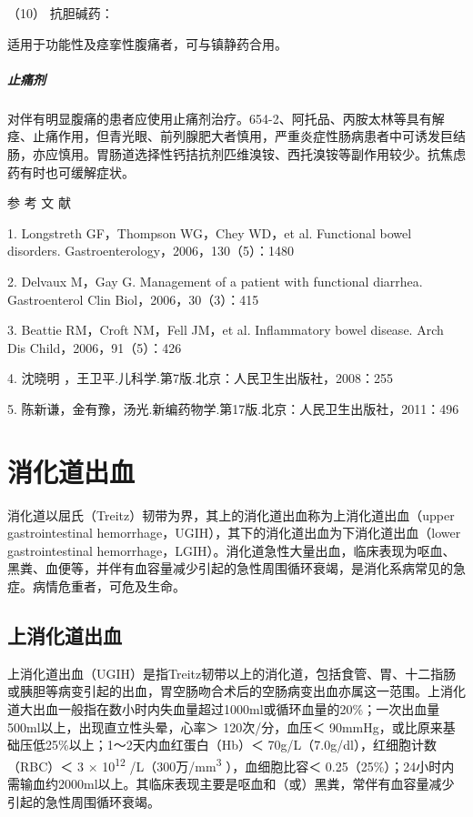 \hypertarget{text00030.htmlux5cux23CHP1-12-3-2-6-10}{}
（10） 抗胆碱药：

适用于功能性及痉挛性腹痛者，可与镇静药合用。

\paragraph{止痛剂}

对伴有明显腹痛的患者应使用止痛剂治疗。654-2、阿托品、丙胺太林等具有解痉、止痛作用，但青光眼、前列腺肥大者慎用，严重炎症性肠病患者中可诱发巨结肠，亦应慎用。胃肠道选择性钙拮抗剂匹维溴铵、西托溴铵等副作用较少。抗焦虑药有时也可缓解症状。

\protect\hypertarget{text00031.html}{}{}

\hypertarget{text00031.htmlux5cux23CHP1-12-4}{}
参 考 文 献

1. Longstreth GF，Thompson WG，Chey WD，et al. Functional bowel
disorders. Gastroenterology，2006，130（5）：1480

2. Delvaux M，Gay G. Management of a patient with functional diarrhea.
Gastroenterol Clin Biol，2006，30（3）：415

3. Beattie RM，Croft NM，Fell JM，et al. Inflammatory bowel disease.
Arch Dis Child，2006，91（5）：426

4. 沈晓明 ，王卫平.儿科学.第7版.北京：人民卫生出版社，2008：255

5.
陈新谦，金有豫，汤光.新编药物学.第17版.北京：人民卫生出版社，2011：496

\protect\hypertarget{text00032.html}{}{}

\chapter{消化道出血}

消化道以屈氏（Treitz）韧带为界，其上的消化道出血称为上消化道出血（upper
gastrointestinal
hemorrhage，UGIH），其下的消化道出血为下消化道出血（lower
gastrointestinal
hemorrhage，LGIH）。消化道急性大量出血，临床表现为呕血、黑粪、血便等，并伴有血容量减少引起的急性周围循环衰竭，是消化系病常见的急症。病情危重者，可危及生命。

\section{上消化道出血}

上消化道出血（UGIH）是指Treitz韧带以上的消化道，包括食管、胃、十二指肠或胰胆等病变引起的出血，胃空肠吻合术后的空肠病变出血亦属这一范围。上消化道大出血一般指在数小时内失血量超过1000ml或循环血量的20\%；一次出血量500ml以上，出现直立性头晕，心率＞
120次/分，血压＜
90mmHg，或比原来基础压低25\%以上；1～2天内血红蛋白（Hb）＜
70g/L（7.0g/dl），红细胞计数（RBC）＜ 3 × 10\textsuperscript{12}
/L（300万/mm\textsuperscript{3} ），血细胞比容＜
0.25（25\%）；24小时内需输血约2000ml以上。其临床表现主要是呕血和（或）黑粪，常伴有血容量减少引起的急性周围循环衰竭。

